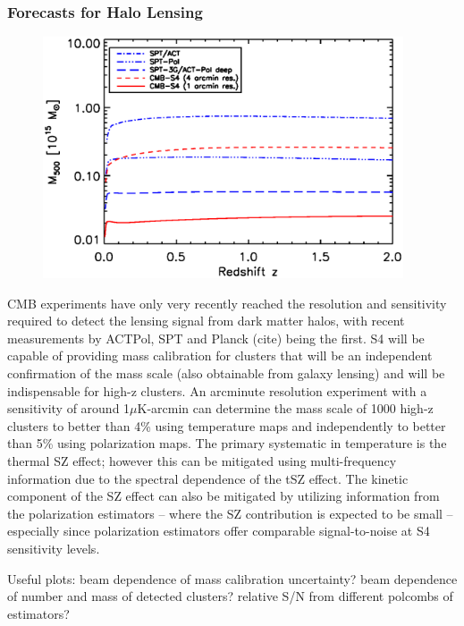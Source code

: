 \subsubsection{Forecasts for Halo Lensing}\label{haloLensForecast}

\begin{figure}[h]
\includegraphics[width=0.95\textwidth]{CMBLensing/m500lim_vs_z_1sigma_cmbs4_v1}
\caption{}
\end{figure}

CMB experiments have only very recently reached the resolution and sensitivity required to detect the lensing signal from dark matter halos, with recent measurements by ACTPol, SPT and Planck (cite) being the first. S4 will be capable of providing mass calibration for clusters that will be an independent confirmation of the mass scale (also obtainable from galaxy lensing) and will be indispensable for high-z clusters. An arcminute resolution experiment with a sensitivity of around 1$\mu$K-arcmin can determine the mass scale of 1000 high-z clusters to better than 4\% using temperature maps and independently to better than 5\% using polarization maps. The primary systematic in temperature is the thermal SZ effect; however this can be mitigated using multi-frequency information due to the spectral dependence of the tSZ effect. The kinetic component of the SZ effect can also be mitigated by utilizing information from the polarization estimators -- where the SZ contribution is expected to be small -- especially since polarization estimators offer comparable signal-to-noise at S4 sensitivity levels.

Useful plots: beam dependence of mass calibration uncertainty? beam dependence of number and mass of detected clusters? relative S/N from different polcombs of estimators?



